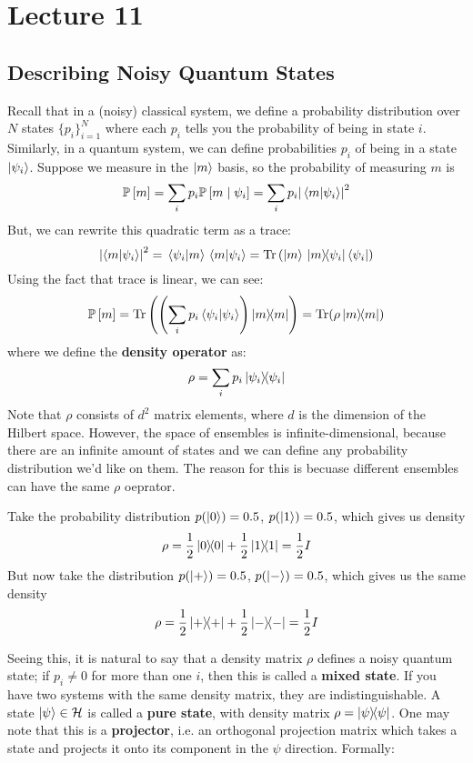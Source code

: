 \section{Lecture 11}

\subsection{Describing Noisy Quantum States}
Recall that in a (noisy) classical system, we define a probability distribution over $N$ states
$\{p_i\}_{i = 1}^N$ where each $p_i$ tells you the probability of being in state $i$. Similarly, in a quantum system,
we can define probabilities $p_i$ of being in a state $\ket{\psi_i}$. Suppose we measure in the $\ket{m}$
basis, so the probability of measuring $m$ is
\[ \mathbb{P}\left[ m \right] = \sum_i p_i \mathbb{P}\left[ m \mid \psi_i \right] = \sum_i p_i \qty|\braket*{m}{\psi_i}|^2 \]
But, we can rewrite this quadratic term as a trace:
\[ \abs{\braket{m}{\psi_i}}^2 = \braket*{\psi_i}{m}\braket*{m}{\psi_i} = \Tr\left(\ket{m}\ketbra*{m}{\psi_i} \bra{\psi_i}\right) \]
Using the fact that trace is linear, we can see:
\[ \mathbb{P}\left[ m \right] = \Tr\qty(\qty(\sum_i p_i \braket{\psi_i}{\psi_i}) \ketbra{m}{m}) = \Tr(\rho \ketbra{m}{m})\]
where we define the \textbf{density operator} as:
\[ \rho = \sum_i p_i \ketbra{\psi_i}{\psi_i} \]
Note that $\rho$ consists of $d^2$ matrix elements, where $d$ is the dimension of the Hilbert space.
However, the space of ensembles is infinite-dimensional, because there are an infinite amount of states
and we can define any probability distribution we'd like on them.
The reason for this is becuase different ensembles can have the same $\rho$ oeprator.

\begin{example}
    Take the probability distribution $p(\ket{0}) = 0.5$, $p(\ket{1}) = 0.5$, which gives us density
    \[ \rho = \frac{1}{2} \ketbra{0}{0} + \frac{1}{2} \ketbra{1}{1} = \frac{1}{2} I \]
    But now take the distribution $p(\ket{+}) = 0.5$, $p(\ket{-}) = 0.5$, which gives us the same density
    \[ \rho = \frac{1}{2} \ketbra{+}{+} + \frac{1}{2} \ketbra{-}{-} = \frac{1}{2} I \]
\end{example}

Seeing this, it is natural to say that a density matrix $\rho$ defines a noisy quantum state; if $p_i \neq 0$ for more than one $i$, then
this is
called a \textbf{mixed state}. If you have two systems
with the same density matrix, they are indistinguishable. A state $\ket{\psi} \in \mathcal{H}$ is called a \textbf{pure state}, with density matrix $\rho = \ketbra{\psi}{\psi}$. One may note that this is a \textbf{projector}, i.e. an orthogonal projection matrix which takes a state and projects it onto its component in the $\psi$ direction. Formally:

